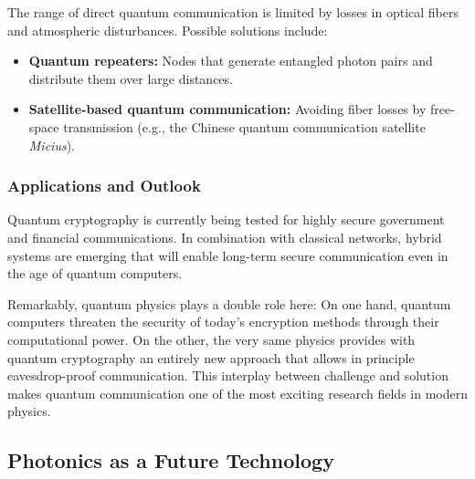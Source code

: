 The range of direct quantum communication is limited by losses in optical fibers and atmospheric disturbances. Possible solutions include:
\begin{itemize}
	\item \textbf{Quantum repeaters:} Nodes that generate entangled photon pairs and distribute them over large distances.
	\item \textbf{Satellite-based quantum communication:} Avoiding fiber losses by free-space transmission (e.g., the Chinese quantum communication satellite \emph{Micius}).
\end{itemize}

\subsubsection{Applications and Outlook}

Quantum cryptography is currently being tested for highly secure government and financial communications. In combination with classical networks, hybrid systems are emerging that will enable long-term secure communication even in the age of quantum computers.

Remarkably, quantum physics plays a double role here:  
On one hand, quantum computers threaten the security of today’s encryption methods through their computational power.  
On the other, the very same physics provides with quantum cryptography an entirely new approach that allows in principle eavesdrop-proof communication.  
This interplay between challenge and solution makes quantum communication one of the most exciting research fields in modern physics.

\subsection{Photonics as a Future Technology}

